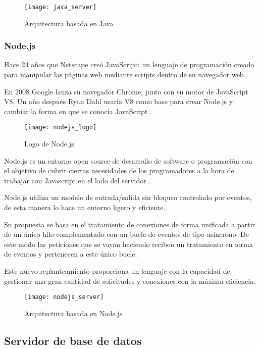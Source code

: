 \begin{figure}[htp!]
  \centering
  \texttt{[image: java\_server]}
  \caption{Arquitectura basada en Java}
  \label{fig:java_server}
\end{figure}

\subsubsection{Node.js}

Hace 24 años que Netscape creó JavaScript: un lenguaje de programación creado para manipular las páginas web mediante scripts dentro de su navegador web \cite{nodejs7}.

En 2008 Google lanza su navegador Chrome, junto con su motor de JavaScript V8. Un año después Ryan Dahl usaría V8 como base para crear Node.js y cambiar la forma en que se conocía JavaScript \cite{nodejs7}.

\begin{figure}[htp!]
  \centering
  \texttt{[image: nodejs\_logo]}
  \caption{Logo de Node.js}
  \label{fig:nodejs_logo}
\end{figure}

Node.js es un entorno open source de desarrollo de software o programación con el objetivo de cubrir ciertas necesidades de los programadores a la hora de trabajar con Javascript en el lado del servidor \cite{nodejs6}.

Node.js utiliza un modelo de entrada/salida sin bloqueo controlado por eventos, de esta manera lo hace un entorno ligero y eficiente.

Su propuesta se basa en el tratamiento de conexiones de forma unificada a partir de un único hilo complementado con un bucle de eventos de tipo asíncrono. De este modo las peticiones que se vayan haciendo reciben un tratamiento en forma de eventos y pertenecen a este único bucle.

Este nuevo replanteamiento proporciona un lenguaje con la capacidad de gestionar una gran cantidad de solicitudes y conexiones con la máxima eficiencia.

\begin{figure}[htp!]
  \centering
  \texttt{[image: nodejs\_server]}
  \caption{Arquitectura basada en Node.js}
  \label{fig:nodejs_server}
\end{figure}

\subsection{Servidor de base de datos}

